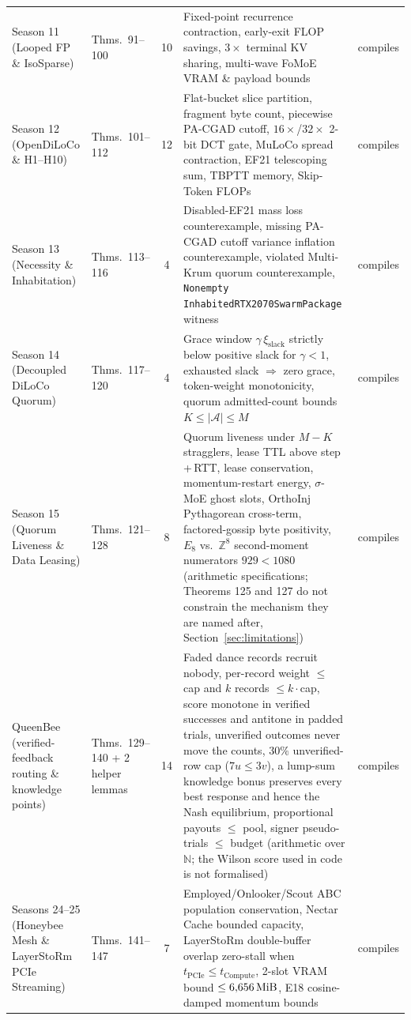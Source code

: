 \documentclass[11pt,a4paper]{article}
\begin{document}
\begin{table}[htbp!]
{\begin{tabular}{@{}llcp{6.7cm}c@{}}
Season 11 (Looped FP \& IsoSparse) & Thms.\ 91--100 & 10 & Fixed-point recurrence contraction, early-exit FLOP savings, $3\times$ terminal KV sharing, multi-wave FoMoE VRAM \& payload bounds & compiles \\
Season 12 (OpenDiLoCo \& H1--H10) & Thms.\ 101--112 & 12 & Flat-bucket slice partition, fragment byte count, piecewise PA-CGAD cutoff, $16\times$/$32\times$ 2-bit DCT gate, MuLoCo spread contraction, EF21 telescoping sum, TBPTT memory, Skip-Token FLOPs & compiles \\
Season 13 (Necessity \& Inhabitation) & Thms.\ 113--116 & 4 & Disabled-EF21 mass loss counterexample, missing PA-CGAD cutoff variance inflation counterexample, violated Multi-Krum quorum counterexample, \texttt{Nonempty InhabitedRTX2070SwarmPackage} witness & compiles \\
Season 14 (Decoupled DiLoCo Quorum) & Thms.\ 117--120 & 4 & Grace window $\gamma\,\xi_{\text{slack}}$ strictly below positive slack for $\gamma < 1$, exhausted slack $\Rightarrow$ zero grace, token-weight monotonicity, quorum admitted-count bounds $K \le |\mathcal{A}| \le M$ & compiles \\
Season 15 (Quorum Liveness \& Data Leasing) & Thms.\ 121--128 & 8 & Quorum liveness under $M-K$ stragglers, lease TTL above step\,+\,RTT, lease conservation, momentum-restart energy, $\sigma$-MoE ghost slots, OrthoInj Pythagorean cross-term, factored-gossip byte positivity, $E_8$ vs.\ $\mathbb{Z}^8$ second-moment numerators $929 < 1080$ (arithmetic specifications; Theorems 125 and 127 do not constrain the mechanism they are named after, Section~\ref{sec:limitations}) & compiles \\
QueenBee (verified-feedback routing \& knowledge points) & Thms.\ 129--140 + 2 helper lemmas & 14 & Faded dance records recruit nobody, per-record weight $\le$ cap and $k$ records $\le k\cdot$cap, score monotone in verified successes and antitone in padded trials, unverified outcomes never move the counts, $30\%$ unverified-row cap ($7u \le 3v$), a lump-sum knowledge bonus preserves every best response and hence the Nash equilibrium, proportional payouts $\le$ pool, signer pseudo-trials $\le$ budget (arithmetic over $\mathbb{N}$; the Wilson score used in code is not formalised) & compiles \\
Seasons 24--25 (Honeybee Mesh \& LayerStoRm PCIe Streaming) & Thms.\ 141--147 & 7 & Employed/Onlooker/Scout ABC population conservation, Nectar Cache bounded capacity, LayerStoRm double-buffer overlap zero-stall when $t_{\text{PCIe}} \le t_{\text{Compute}}$, 2-slot VRAM bound $\le 6{,}656\text{\,MiB}$, E18 cosine-damped momentum bounds & compiles \\

\end{tabular}}
\end{table}
\end{document}

